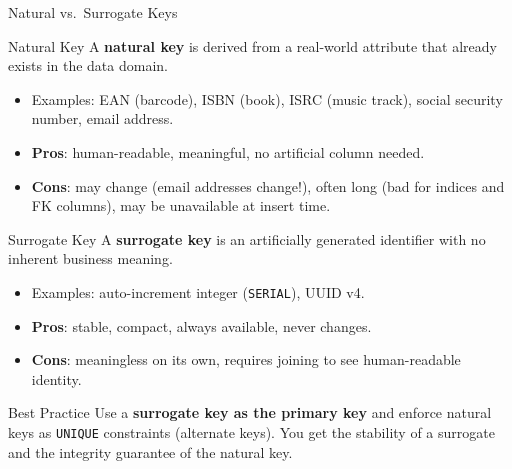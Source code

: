 \begin{frame}{Natural vs.\ Surrogate Keys}
  \begin{block}{Natural Key}
    A \textbf{natural key} is derived from a real-world attribute that
    already exists in the data domain.
    \begin{itemize}
      \item Examples: EAN (barcode), ISBN (book), ISRC (music track),
            social security number, email address.
      \item \textbf{Pros}: human-readable, meaningful, no artificial column needed.
      \item \textbf{Cons}: may change (email addresses change!), often long
            (bad for indices and FK columns), may be unavailable at insert time.
    \end{itemize}
  \end{block}

  \begin{block}{Surrogate Key}
    A \textbf{surrogate key} is an artificially generated identifier with
    no inherent business meaning.
    \begin{itemize}
      \item Examples: auto-increment integer (\texttt{SERIAL}), UUID v4.
      \item \textbf{Pros}: stable, compact, always available, never changes.
      \item \textbf{Cons}: meaningless on its own, requires joining to see
            human-readable identity.
    \end{itemize}
  \end{block}

  \begin{alertblock}{Best Practice}
    Use a \textbf{surrogate key as the primary key} and enforce natural
    keys as \texttt{UNIQUE} constraints (alternate keys).  You get the
    stability of a surrogate and the integrity guarantee of the natural key.
  \end{alertblock}
\end{frame}

